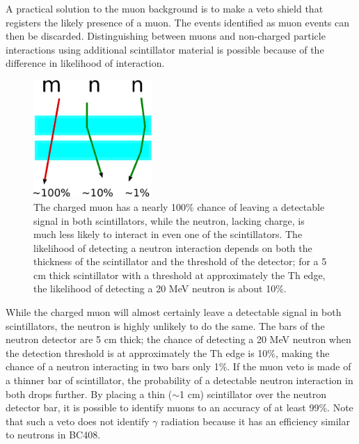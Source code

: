 A practical solution to the muon background is to make a veto shield that registers the likely presence of a muon.  The events identified as muon events can then be discarded.  Distinguishing between muons and non-charged particle interactions using additional scintillator material is possible because of the difference in likelihood of interaction.  
\begin{figure}[hp]
\centering
\includegraphics[width=0.4\textwidth]{figures/simpleVeto.eps}
\caption{The charged muon has a nearly 100\% chance of leaving a detectable signal in both scintillators, while the neutron, lacking charge, is much less likely to interact in even one of the scintillators.  The likelihood of detecting a neutron interaction depends on both the thickness of the scintillator and the threshold of the detector; for a 5 cm thick scintillator with a threshold at approximately the Th edge, the likelihood of detecting a 20 MeV neutron is about 10\%.}
\label{fig:simpleVeto}
\end{figure}
While the charged muon will almost certainly leave a detectable signal in both scintillators, the neutron is highly unlikely to do the same.  The bars of the neutron detector are 5 cm thick; the chance of detecting a 20 MeV neutron when the detection threshold is at approximately the Th edge is 10\%, making the chance of a neutron interacting in two bars only 1\%.  If the muon veto is made of a thinner bar of scintillator, the probability of a detectable neutron interaction in both drops further.  By placing a thin ($\sim$1 cm) scintillator over the neutron detector bar, it is possible to identify muons to an accuracy of at least 99\%.  Note that such a veto does not identify $\gamma$ radiation because it has an efficiency similar to neutrons in BC408.

